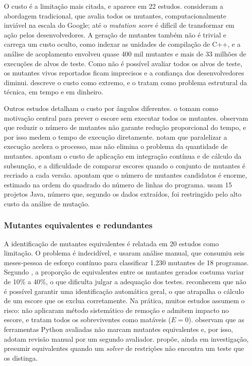 O custo é a limitação mais citada, e aparece em 22 estudos.  consideram a abordagem tradicional, que avalia todos os mutantes, computacionalmente inviável na escala do Google; até o \textit{mutation score} é difícil de transformar em ação pelos desenvolvedores. A geração de mutantes também não é trivial e carrega um custo oculto, como indexar as unidades de compilação de C++, e a análise de acoplamento envolveu quase 400 mil mutantes e mais de 33 milhões de execuções de alvos de teste. Como não é possível avaliar todos os alvos de teste, os mutantes vivos reportados ficam imprecisos e a confiança dos desenvolvedores diminui.  descreve o custo como extremo, e  o tratam como problema estrutural da técnica, em tempo e em dinheiro.

Outros estudos detalham o custo por ângulos diferentes.  o tomam como motivação central para prever o escore sem executar todos os mutantes.  observam que reduzir o número de mutantes não garante redução proporcional do tempo, e por isso medem o tempo de execução diretamente.  notam que paralelizar a execução acelera o processo, mas não elimina o problema da quantidade de mutantes.  apontam o custo de aplicação em integração contínua e de cálculo da subsunção, e a dificuldade de comparar escores quando o conjunto de mutantes é recriado a cada versão.  apontam que o número de mutantes candidatos é enorme, estimado na ordem do quadrado do número de linhas do programa.  usam 15 projetos Java, número que, segundo os dados extraídos, foi restringido pelo alto custo da análise de mutação.

\subsubsection{Mutantes equivalentes e redundantes}
\label{subsubsec:mutantes-equivalentes}

A identificação de mutantes equivalentes é relatada em 20 estudos como limitação. O problema é indecidível, e  usaram análise manual, que consumiu seis meses-pessoa de esforço contínuo para classificar 1.230 mutantes de 18 programas. Segundo , a proporção de equivalentes entre os mutantes gerados costuma variar de 10\% a 40\%, o que dificulta julgar a adequação dos testes.  reconhecem que não é possível garantir uma identificação automática geral, o que atrapalha o cálculo de um escore que os exclua corretamente. Na prática, muitos estudos assumem o risco:  não aplicaram método sistemático de remoção e admitem impacto no escore, e  tratam todos os sobreviventes como matáveis ($E = 0$).  observam que as ferramentas Python avaliadas não marcam mutantes equivalentes e, por isso, adotam revisão manual por um segundo avaliador.  propõe, ainda em investigação, presumir equivalentes quando um \textit{solver} de restrições não encontra um teste que os distinga.

